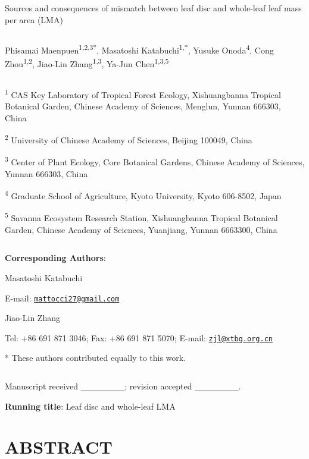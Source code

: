 \documentclass[
  12pt,
  a4paper,
,tablecaptionabove
]{scrartcl}
\date{}
\title{}
\author{}
\begin{document}




Sources and consequences of mismatch between leaf disc and whole-leaf
leaf mass per area (LMA)

\[ \]

Phisamai Maenpuen\textsuperscript{1,2,3*}, Masatoshi
Katabuchi\textsuperscript{1,*}, Yusuke Onoda\textsuperscript{4}, Cong
Zhou\textsuperscript{1,2}, Jiao-Lin Zhang\textsuperscript{1,3}, Ya-Jun
Chen\textsuperscript{1,3,5}

\[ \]

\textsuperscript{1} CAS Key Laboratory of Tropical Forest Ecology,
Xishuangbanna Tropical Botanical Garden, Chinese Academy of Sciences,
Menglun, Yunnan 666303, China

\textsuperscript{2} University of Chinese Academy of Sciences, Beijing
100049, China

\textsuperscript{3} Center of Plant Ecology, Core Botanical Gardens,
Chinese Academy of Sciences, Yunnan 666303, China

\textsuperscript{4} Graduate School of Agriculture, Kyoto University,
Kyoto 606-8502, Japan

\textsuperscript{5} Savanna Ecosystem Research Station, Xishuangbanna
Tropical Botanical Garden, Chinese Academy of Sciences, Yuanjiang,
Yunnan 6663300, China

\[ \]

\textbf{Corresponding Authors}:

Masatoshi Katabuchi

E-mail:
\href{mailto:mattocci27@gmail.com}{\nolinkurl{mattocci27@gmail.com}}

Jiao-Lin Zhang

Tel: +86 691 871 3046; Fax: +86 691 871 5070; E-mail:
\href{mailto:zjl@xtbg.org.cn}{\nolinkurl{zjl@xtbg.org.cn}}

* These authors contributed equally to this work.

\[ \]

Manuscript received \_\_\_\_\_\_\_; revision accepted \_\_\_\_\_\_\_.

\textbf{Running title}: Leaf disc and whole-leaf LMA

\newpage

\hypertarget{abstract}{%
\section{ABSTRACT}\label{abstract}}
\end{document}
